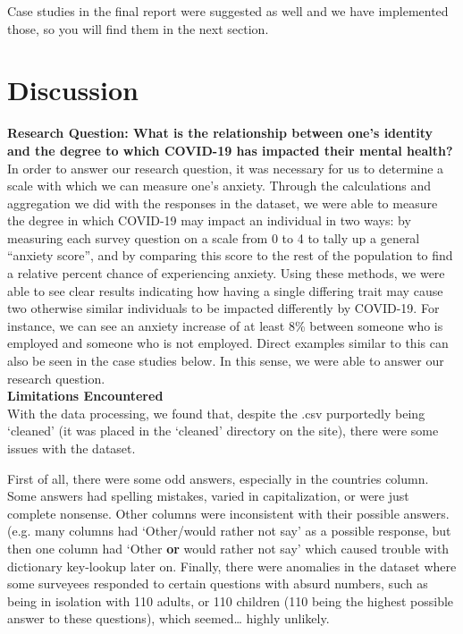 \documentclass[fontsize=11pt]{article}
\begin{document}
    Case studies in the final report were suggested as well and we have implemented those, so you will find them in the next section.

    \section*{Discussion}
    \textbf{Research Question: What is the relationship between one’s identity and the degree to which COVID-19 has impacted their mental health?} \\
    In order to answer our research question, it was necessary for us to determine a scale with which we can measure one’s anxiety. Through the calculations and aggregation we did with the responses in the dataset, we were able to measure the degree in which COVID-19 may impact an individual in two ways: by measuring each survey question on a scale from 0 to 4 to tally up a general “anxiety score”, and by comparing this score to the rest of the population to find a relative percent chance of experiencing anxiety. Using these methods, we were able to see clear results indicating how having a single differing trait may cause two otherwise similar individuals to be impacted differently by COVID-19. For instance, we can see an anxiety increase of at least 8\% between someone who is employed and someone who is not employed. Direct examples similar to this can also be seen in the case studies below. In this sense, we were able to answer our research question. \\

    \textbf{Limitations Encountered} \\
    With the data processing, we found that, despite the .csv purportedly being ‘cleaned’ (it was placed in the ‘cleaned’ directory on the site), there were some issues with the dataset.

    First of all, there were some odd answers, especially in the countries column. Some answers had spelling mistakes, varied in capitalization, or were just complete nonsense. Other columns were inconsistent with their possible answers. (e.g. many columns had ‘Other/would rather not say’ as a possible response, but then one column had ‘Other \textbf{or} would rather not say’ which caused trouble with dictionary key-lookup later on. Finally, there were anomalies in the dataset where some surveyees responded to certain questions with absurd numbers, such as being in isolation with 110 adults, or 110 children (110 being the highest possible answer to these questions), which seemed… highly unlikely.
\end{document}
